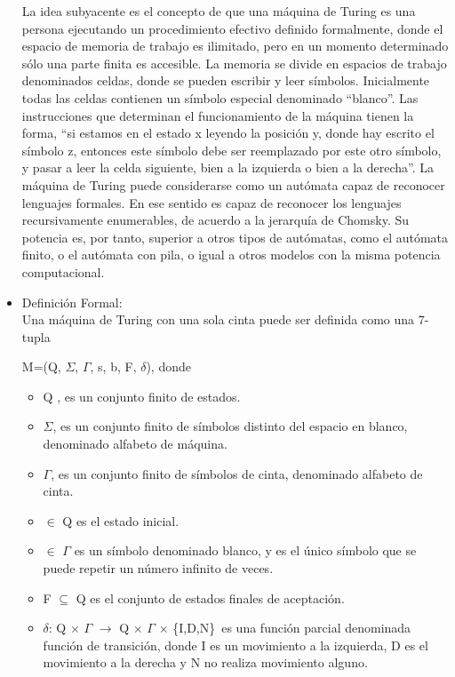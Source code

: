 \documentclass[12pt,a4paper,spanish]{book}
\begin{document}
\begin{itemize}
La idea subyacente es el concepto de que una m\'aquina de Turing es una persona ejecutando un procedimiento efectivo definido formalmente, donde el espacio de memoria de trabajo es ilimitado, pero en un momento determinado s\'olo una parte finita es accesible. La memoria se divide en espacios de trabajo denominados celdas, donde se pueden escribir y leer s\'imbolos. Inicialmente todas las celdas contienen un s\'imbolo especial denominado ``blanco''. Las instrucciones que determinan el funcionamiento de la m\'aquina tienen la forma, ``si estamos en el estado x leyendo la posici\'on y, donde hay escrito el s\'imbolo z, entonces este s\'imbolo debe ser reemplazado por este otro s\'imbolo, y pasar a leer la celda siguiente, bien a la izquierda o bien a la derecha''. La m\'aquina de Turing puede considerarse como un aut\'omata capaz de reconocer lenguajes formales. En ese sentido es capaz de reconocer los lenguajes recursivamente enumerables, de acuerdo a la jerarqu\'ia de Chomsky. Su potencia es, por tanto, superior a otros tipos de aut\'omatas, como el aut\'omata finito, o el aut\'omata con pila, o igual a otros modelos con la misma potencia computacional.\\
\item Definici\'on Formal:\\
\newline
Una m\'aquina de Turing con una sola cinta puede ser definida como una 7-tupla\\
\begin{center}
M=(Q, $\Sigma$, $\Gamma$, s, b, F, $\delta$), donde
\end{center}
\begin{itemize}
\item Q , es un conjunto finito de estados.
\item $\Sigma$, es un conjunto finito de s\'imbolos distinto del espacio en blanco, denominado alfabeto de m\'aquina.
\item $\Gamma$, es un conjunto finito de s\'imbolos de cinta, denominado alfabeto de cinta.
\item $\in$ Q es el estado inicial.
\item $\in$ $\Gamma$ es un s\'imbolo denominado blanco, y es el \'unico s\'imbolo que se puede repetir un n\'umero infinito de veces.
\item F $\subseteq$ Q es el conjunto de estados finales de aceptaci\'on.
\item $\delta$: Q $\times$ $\Gamma$ $\rightarrow$ Q $\times$ $\Gamma$ $\times$ \{I,D,N\}\, es una funci\'on parcial denominada funci\'on de transici\'on, donde I es un movimiento a la izquierda, D es el movimiento a la derecha y N no realiza movimiento alguno.

\end{itemize}
\end{itemize}
\end{document}
